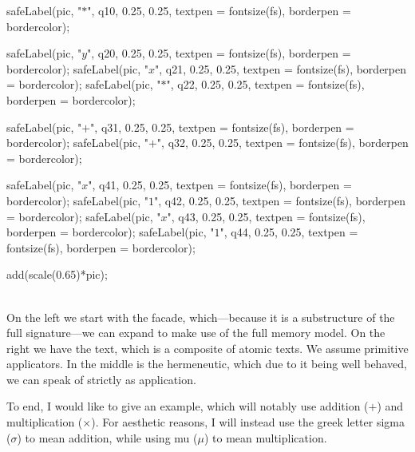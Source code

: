 \documentclass[twoside]{article}
\begin{document}
\begin{minipage}{12cm}
\begin{itemize}
\begin{center}
\begin{asy}
	 safeLabel(pic, "$*$", q10, 0.25, 0.25, textpen = fontsize(fs), borderpen = bordercolor);
	
	 safeLabel(pic, "$y$", q20, 0.25, 0.25, textpen = fontsize(fs), borderpen = bordercolor);
	 safeLabel(pic, "$x$", q21, 0.25, 0.25, textpen = fontsize(fs), borderpen = bordercolor);
	 safeLabel(pic, "$*$", q22, 0.25, 0.25, textpen = fontsize(fs), borderpen = bordercolor);
	
	 safeLabel(pic, "$+$", q31, 0.25, 0.25, textpen = fontsize(fs), borderpen = bordercolor);
	 safeLabel(pic, "$+$", q32, 0.25, 0.25, textpen = fontsize(fs), borderpen = bordercolor);
	
	 safeLabel(pic, "$x$", q41, 0.25, 0.25, textpen = fontsize(fs), borderpen = bordercolor);
	 safeLabel(pic, "$1$", q42, 0.25, 0.25, textpen = fontsize(fs), borderpen = bordercolor);
	 safeLabel(pic, "$x$", q43, 0.25, 0.25, textpen = fontsize(fs), borderpen = bordercolor);
	 safeLabel(pic, "$1$", q44, 0.25, 0.25, textpen = fontsize(fs), borderpen = bordercolor);
	 
	 add(scale(0.65)*pic);
	
	 \end{asy}
	\end{center}
	\ \\[-5ex]
	On the left we start with the facade, which---because it is a substructure of the full signature---we
	can expand to make use of the full memory model. On the right we have the text, which is a composite
	of atomic texts. We assume primitive applicators. In the middle is the hermeneutic, which due to it
	being well behaved, we can speak of strictly as application.

\end{itemize}


\end{minipage}\newpage\begin{minipage}{12cm}


To end, I would like to give an example, which will notably use addition ($ + $) and multiplication ($ \times $).
For aesthetic reasons, I will instead use the greek letter sigma ($ \sigma $) to mean addition, while using mu
($ \mu $) to mean multiplication.


\end{minipage}
\end{document}
